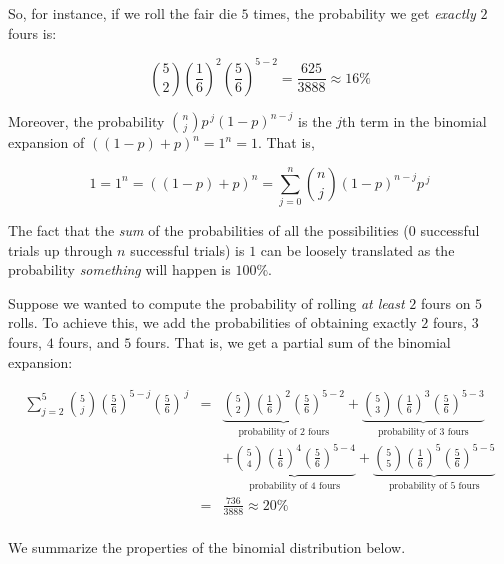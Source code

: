\documentclass{ximera}
\begin{document}
 

So, for instance, if we roll the fair die $5$ times, the probability we get \textit{exactly} $2$ fours is:

\[ \binom{5}{2} \left( \frac{1}{6} \right)^{2} \left( \frac{5}{6} \right)^{5-2} =  \frac{625}{3888} \approx  16 \%\] 

 

Moreover,  the probability $\displaystyle{\binom{n}{j} p^{\, j} (1-p)^{n-j}}$ is the $j$th term in the binomial expansion of $((1-p)+p)^{n} = 1^{n} = 1$. That is,

\[ 1 = 1^{n} = ((1-p)+p)^{n} = \displaystyle{\sum_{j=0}^{n} \binom{n}{j} (1-p)^{n-j} p^{\, j}} \]

The fact that  the \textit{sum} of the probabilities of all the possibilities ($0$ successful trials up through $n$ successful trials) is $1$ can be loosely translated as the probability \textit{something} will happen  is $100 \%$.

 



Suppose we wanted to compute the probability of rolling \textit{at least} $2$ fours on $5$ rolls.  To achieve this, we  add the probabilities of obtaining exactly $2$ fours, $3$ fours, $4$ fours, and $5$ fours.  That is, we get a partial sum of the binomial expansion: 

\[ \begin{array}{rcl}

\displaystyle{\sum_{j=2}^{5} \binom{5}{j} \left( \frac{5}{6} \right)^{5-j} \left(\frac{5}{6} \right)^{\, j}} &  = &  \underbrace{\binom{5}{2} \left( \frac{1}{6} \right)^{2} \left( \frac{5}{6} \right)^{5-2}}_{\text{probability of $2$ fours}}   + \underbrace{\binom{5}{3} \left( \frac{1}{6} \right)^{3} \left( \frac{5}{6} \right)^{5-3}}_{\text{probability of $3$ fours}}  \\ 
  && + \underbrace{\binom{5}{4} \left( \frac{1}{6} \right)^{4} \left( \frac{5}{6} \right)^{5-4}}_{\text{probability of $4$ fours}} + \underbrace{\binom{5}{5} \left( \frac{1}{6} \right)^{5} \left( \frac{5}{6} \right)^{5-5}}_{\text{probability of $5$ fours}} \\ 
  
  & = &  \frac{736}{3888} \approx 20 \%  \\ \end{array} \]
  
 We summarize the properties of the binomial distribution below.
 
   
\end{document}
